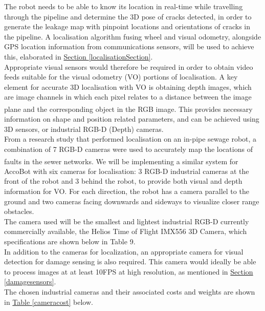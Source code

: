 \documentclass[11pt]{article}		%
\newcommand{\supercite}[1]{\textsuperscript{\cite{#1}}}		%
\newcommand{\tableref}[1]{\hyperref[#1]{Table \ref*{#1}}}     %
\newcommand{\sectref}[1]{\hyperref[#1]{Section \ref*{#1}}}     %
\begin{document}
	        The robot needs to be able to know its location in real-time while travelling through the pipeline and determine the 3D pose of cracks detected, in order to generate the leakage map with pinpoint locations and orientations of cracks in the pipeline. A localisation algorithm fusing wheel and visual odometry, alongside GPS location information from communications sensors, will be used to achieve this, elaborated in \sectref{localisationSection}.
            \\
            \hspace*{3ex}Appropriate visual sensors would therefore be required in order to obtain video feeds suitable for the visual odometry (VO) portions of localisation. A key element for accurate 3D localisation with VO is obtaining depth images, which are image channels in which each pixel relates to a distance between the image plane and the corresponding object in the RGB image\supercite{visualodometry}. This provides necessary information on shape and position related parameters, and can be achieved using 3D sensors, or industrial RGB-D (Depth) cameras.
            \\
            \hspace*{3ex}From a research study that performed localisation on an in-pipe sewage robot, a combination of 7 RGB-D cameras were used to accurately map the locations of faults in the sewer networks\supercite{sewerpaper}. We will be implementing a similar system for AccoBot with six cameras for localisation: 3 RGB-D industrial cameras at the front of the robot and 3 behind the robot, to provide both visual and depth information for VO. For each direction, the robot has a camera parallel to the ground and two cameras facing downwards and sideways to visualize closer range obstacles. 
	        \\
            \hspace*{3ex}The camera used will be the smallest and lightest industrial RGB-D currently commercially available, the Helios Time of Flight IMX556 3D Camera, which specifications are shown below in Table 9. 
	        \\
            \hspace*{3ex}In addition to the cameras for localization, an appropriate camera for visual detection for damage sensing is also required. This camera would ideally be able to process images at at least 10FPS at high resolution, as mentioned in \sectref{damagesensors}.
	        \\
            \hspace*{3ex}The chosen industrial cameras and their associated costs and weights are shown in \tableref{cameracost} below.
\end{document}
